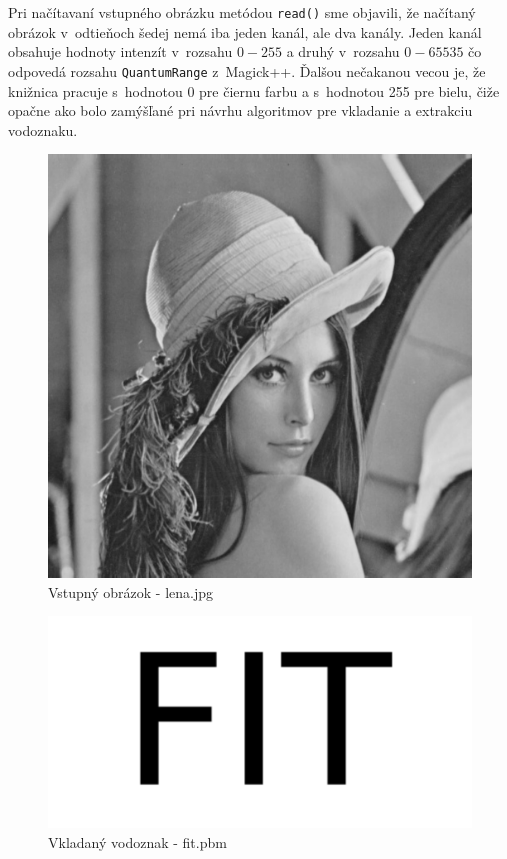 Pri načítavaní vstupného obrázku metódou {\tt read()} sme objavili, že načítaný obrázok v~odtieňoch šedej nemá iba jeden kanál, ale dva kanály. Jeden kanál obsahuje hodnoty intenzít v~rozsahu $0 - 255$ a druhý v~rozsahu $0-65535$ čo odpovedá rozsahu {\tt QuantumRange} z~Magick++. Ďalšou nečakanou vecou je, že knižnica pracuje s~hodnotou 0 pre čiernu farbu a s~hodnotou 255 pre bielu, čiže opačne ako bolo zamýšľané pri návrhu algoritmov pre vkladanie a extrakciu vodoznaku.

\begin{figure}
    \centering
    \includegraphics[scale=0.5]{obrazky/lena}
    \caption{Vstupný obrázok - lena.jpg}
    \label{fig:lena}
\end{figure}

\begin{figure}
    \centering
    \includegraphics[scale=0.5]{obrazky/fit}
    \caption{Vkladaný vodoznak - fit.pbm}
    \label{fig:watermark}
\end{figure}

